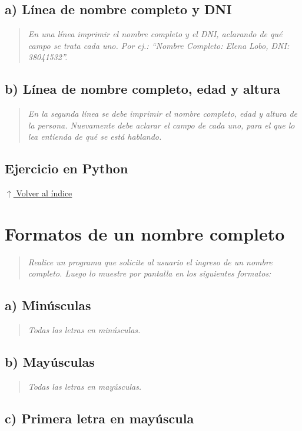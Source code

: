 \documentclass[12pt]{article}
\newcommand{\codigopython}[2]{%
}
\newcommand{\volverindice}{%
    \vspace{1em}%
    \begin{flushright}%
        \hyperlink{indice}{\small $\uparrow$ Volver al índice}%
    \end{flushright}%
}
\newcommand{\enunciado}[1]{%
    \begin{quote}
        \itshape #1
    \end{quote}
}
\begin{document}
\subsection*{a) Línea de nombre completo y DNI}

\enunciado{En una línea imprimir el nombre completo y el DNI, aclarando de qué campo se trata cada uno. Por ej.: \enquote{Nombre Completo: Elena Lobo, DNI: 38041532}.}

\subsection*{b) Línea de nombre completo, edad y altura}

\enunciado{En la segunda línea se debe imprimir el nombre completo, edad y altura de la persona. Nuevamente debe aclarar el campo de cada uno, para el que lo lea entienda de qué se está hablando.}

\subsection*{Ejercicio en Python}

\codigopython{13}{Datos personales: nombre, DNI, edad y altura}

\volverindice
\newpage


\section{Formatos de un nombre completo}

\enunciado{Realice un programa que solicite al usuario el ingreso de un nombre completo. Luego lo muestre por pantalla en los siguientes formatos:}

\subsection*{a) Minúsculas}

\enunciado{Todas las letras en minúsculas.}

\subsection*{b) Mayúsculas}

\enunciado{Todas las letras en mayúsculas.}

\subsection*{c) Primera letra en mayúscula}
\end{document}
